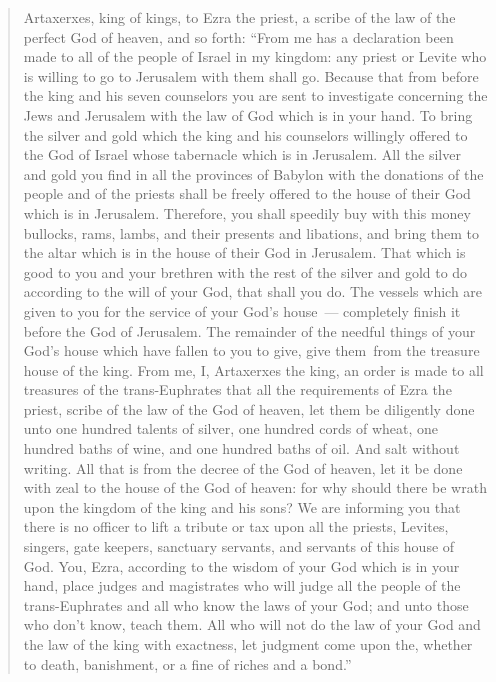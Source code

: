 \begin{quote}
  \begin{inparaenum}\setcounter{enumi}{11}
     Artaxerxes, king of kings, to Ezra the priest, a scribe of the law of the perfect God of heaven, and so forth:%
     ``From me has a declaration been made to all of the people of Israel in my kingdom: any priest or Levite who is willing to go to Jerusalem with them shall go.%
     Because that from before the king and his seven counselors you are sent to investigate concerning the Jews and Jerusalem with the law of God which is in your hand.%
     To bring the silver and gold which the king and his counselors willingly offered to the God of Israel whose tabernacle which is in Jerusalem.%
     All the silver and gold you find in all the provinces of Babylon with the donations of the people and of the priests shall be freely offered to the house of their God which is in Jerusalem.%
     Therefore, you shall speedily buy with this money bullocks, rams, lambs, and their presents and libations, and bring them to the altar which is in the house of their God in Jerusalem.%
     That which is good to you and your brethren with the rest of the silver and gold to do according to the will of your God, that shall you do.%
     The vessels which are given to you for the service of your God's house~--- completely finish it before the God of Jerusalem.%
     The remainder of the needful things of your God's house which have fallen to you to give, give them\understood\ from the treasure house of the king.%
     From me, I, Artaxerxes the king, an order is made to all treasures of the trans-Euphrates that all the requirements of Ezra the priest, scribe of the law of the God of heaven, let them be diligently done%
     unto one hundred talents of silver, one hundred cords of wheat, one hundred baths of wine, and one hundred baths of oil. And salt without writing.%
     All that is from the decree of the God of heaven, let it be done with zeal to the house of the God of heaven: for why should there be wrath upon the kingdom of the king and his sons?%
     We are informing you that there is no officer to lift a tribute or tax upon all the priests, Levites, singers, gate keepers, sanctuary servants, and servants of this house of God.%
     You, Ezra, according to the wisdom of your God which is in your hand, place judges and magistrates who will judge all the people of the trans-Euphrates and all who know the laws of your God; and unto those who don't know, teach them.%
     All who will not do the law of your God and the law of the king with exactness, let judgment come upon the, whether to death, banishment, or a fine of riches and a bond.''%
  \end{inparaenum}
\end{quote}
